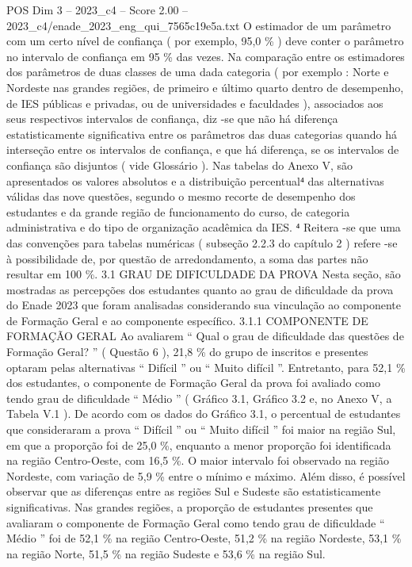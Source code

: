 \begin{textsample}{POS Dim 3 – 2023\_c4 – Score 2.00 – 2023\_c4/enade\_2023\_eng\_qui\_7565c19e5a.txt}
O estimador de um parâmetro com um certo nível de confiança ( por exemplo, 95,0 \% ) deve conter o parâmetro no intervalo de confiança em 95 \% das vezes.
Na comparação entre os estimadores dos parâmetros de duas classes de uma dada categoria ( por exemplo : Norte e Nordeste nas grandes regiões, de primeiro e último quarto dentro de desempenho, de IES públicas e privadas, ou de universidades e faculdades ), associados aos seus respectivos intervalos de confiança, diz -se que não há diferença estatisticamente significativa entre os parâmetros das duas categorias quando há interseção entre os intervalos de confiança, e que há diferença, se os intervalos de confiança são disjuntos ( vide Glossário ).
Nas tabelas do Anexo V, são apresentados os valores absolutos e a distribuição percentual⁴ das alternativas válidas das nove questões, segundo o mesmo recorte de desempenho dos estudantes e da grande região de funcionamento do curso, de categoria administrativa e do tipo de organização acadêmica da IES. ⁴ Reitera -se que uma das convenções para tabelas numéricas ( subseção 2.2.3 do capítulo 2 ) refere -se à possibilidade de, por questão de arredondamento, a soma das partes não resultar em 100 \%. 3.1 GRAU DE DIFICULDADE DA PROVA Nesta seção, são mostradas as percepções dos estudantes quanto ao grau de dificuldade da prova do Enade 2023 que foram analisadas considerando sua vinculação ao componente de Formação Geral e ao componente específico. 3.1.1 COMPONENTE DE FORMAÇÃO GERAL Ao avaliarem “ Qual o grau de dificuldade das questões de Formação Geral? ” ( Questão 6 ), 21,8 \% do grupo de inscritos e presentes optaram pelas alternativas “ Difícil ” ou “ Muito difícil ”.
Entretanto, para 52,1 \% dos estudantes, o componente de Formação Geral da prova foi avaliado como tendo grau de dificuldade “ Médio ” ( Gráfico 3.1, Gráfico 3.2 e, no Anexo V, a Tabela V.1 ).
De acordo com os dados do Gráfico 3.1, o percentual de estudantes que consideraram a prova “ Difícil ” ou “ Muito difícil ” foi maior na região Sul, em que a proporção foi de 25,0 \%, enquanto a menor proporção foi identificada na região Centro-Oeste, com 16,5 \%.
O maior intervalo foi observado na região Nordeste, com variação de 5,9 \% entre o mínimo e máximo.
Além disso, é possível observar que as diferenças entre as regiões Sul e Sudeste são estatisticamente significativas.
Nas grandes regiões, a proporção de estudantes presentes que avaliaram o componente de Formação Geral como tendo grau de dificuldade “ Médio ” foi de 52,1 \% na região Centro-Oeste, 51,2 \% na região Nordeste, 53,1 \% na região Norte, 51,5 \% na região Sudeste e 53,6 \% na região Sul.

\end{textsample}
